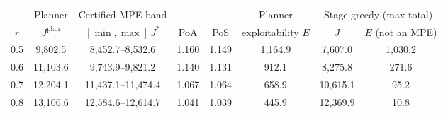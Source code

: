 \begin{tabular}{cccccccc}
\toprule
 & Planner & Certified MPE band & & & Planner & \multicolumn{2}{c}{Stage-greedy (max-total)} \\
$r$ & $J^{\text{plan}}$ & $[\min,\max]\,J^{*}$ & PoA & PoS & exploitability $E$ & $J$ & $E$ (not an MPE) \\
\midrule
0.5 & 9{,}802.5 & 8{,}452.7--8{,}532.6 & 1.160 & 1.149 & 1{,}164.9 & 7{,}607.0 & 1{,}030.2 \\
0.6 & 11{,}103.6 & 9{,}743.9--9{,}821.2 & 1.140 & 1.131 & 912.1 & 8{,}275.8 & 271.6 \\
0.7 & 12{,}204.1 & 11{,}437.1--11{,}474.4 & 1.067 & 1.064 & 658.9 & 10{,}615.1 & 95.2 \\
0.8 & 13{,}106.6 & 12{,}584.6--12{,}614.7 & 1.041 & 1.039 & 445.9 & 12{,}369.9 & 10.8 \\
\bottomrule
\end{tabular}
